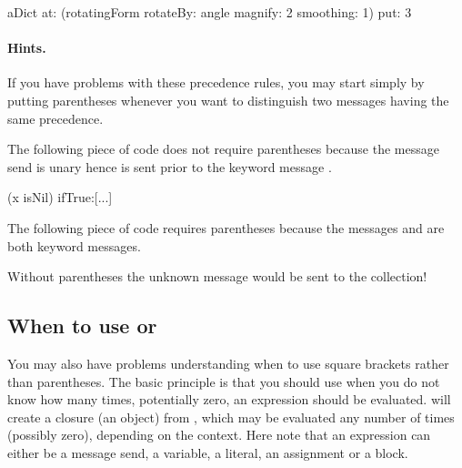 \documentclass[a4paper,10pt,twoside]{book}
\begin{document}
\begin{code}{}
aDict
   at: (rotatingForm 
          rotateBy: angle	
          magnify: 2 
          smoothing: 1)
   put: 3
\end{code}



\paragraph{Hints.} If you have problems with these precedence rules, you may start simply by putting parentheses whenever you want to distinguish two messages having the same precedence.

The following piece of code does not require parentheses because the message send   is unary hence is sent prior to the keyword message .
\begin{code}{}
(x isNil)
   ifTrue:[...]
\end{code}

The following piece of code requires parentheses because the messages  and  are both keyword messages. 
\noindent
Without parentheses the unknown message  would be sent to the collection!

\subsection{When to use \lct{[ ]} or \lct{( )}}
You may also have problems understanding when to use square brackets rather than parentheses.
The basic principle is that you should use \ct{[ ]} when you do not know how many times, potentially zero, an expression should be evaluated.
 will create a  closure (\ie an object) from , which may be evaluated any number of times (possibly zero), depending on the context. Here note that an expression can either be a message send, a variable, a literal, an assignment or a block.
\end{document}
